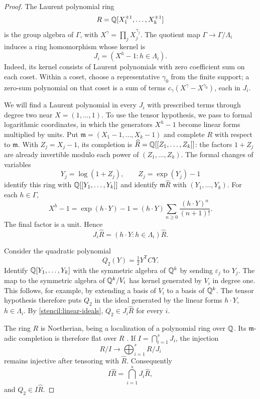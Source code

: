 \begin{proof}
The Laurent polynomial ring
\[
 R=\mathbb Q[X_1^{\pm1},\ldots,X_k^{\pm1}]
\]
is the group algebra of $\Gamma$, with $X^\gamma=\prod_jX_j^{\gamma_j}$.
The quotient map $\Gamma\to\Gamma/\Lambda_i$ induces a ring
homomorphism whose kernel is
\[
 J_i=(X^h-1:h\in\Lambda_i).
\]
Indeed, its kernel consists of Laurent polynomials with zero coefficient
sum on each coset. Within a coset, choose a representative $\gamma_0$
from the finite support; a zero-sum polynomial on that coset is a sum of
terms $c_\gamma(X^\gamma-X^{\gamma_0})$, each in $J_i$.

We will find a Laurent polynomial in every $J_i$ with prescribed
terms through degree two near $X=(1,\ldots,1)$.
To use the tensor hypothesis, we pass to formal logarithmic coordinates,
in which the generators $X^h-1$ become linear forms multiplied by units.
Put $\mathfrak m=(X_1-1,\ldots,X_k-1)$ and complete $R$ with respect
to $\mathfrak m$. With $Z_j=X_j-1$, its completion is
$\widehat R=\mathbb Q[[Z_1,\ldots,Z_k]]$: the factors $1+Z_j$ are already
invertible modulo each power of $(Z_1,\ldots,Z_k)$.
The formal changes of variables
\[
 Y_j=\log(1+Z_j),\qquad Z_j=\exp(Y_j)-1
\]
identify this ring with $\mathbb Q[[Y_1,\ldots,Y_k]]$ and identify
$\mathfrak m\widehat R$ with $(Y_1,\ldots,Y_k)$.
For each $h\in\Gamma$,
\[
 X^h-1=\exp(h\cdot Y)-1
       =(h\cdot Y)\sum_{n\geq0}\frac{(h\cdot Y)^n}{(n+1)!}.
\]
The final factor is a unit. Hence
\begin{equation}\label{stencil:linear-ideals}
 J_i\widehat R=(h\cdot Y:h\in\Lambda_i)\widehat R.
\end{equation}

Consider the quadratic polynomial
\[
 Q_2(Y)=\tfrac12Y^{\mathsf T}CY.
\]
Identify $\mathbb Q[Y_1,\ldots,Y_k]$ with the symmetric algebra of $\mathbb Q^k$
by sending $\varepsilon_j$ to $Y_j$. The map to the symmetric algebra
of $\mathbb Q^k/V_i$ has kernel generated by $V_i$ in degree one. This follows, for example,
by extending a basis of $V_i$ to a basis of $\mathbb Q^k$.
The tensor hypothesis therefore puts $Q_2$ in the ideal generated by
the linear forms $h\cdot Y$, $h\in\Lambda_i$. By
\eqref{stencil:linear-ideals}, $Q_2\in J_i\widehat R$ for every $i$.

The ring $R$ is Noetherian, being a localization of a polynomial ring
over $\mathbb Q$. Its $\mathfrak m$-adic completion is therefore flat over
$R$ \cite[Lemma~10.97.2, Tag~00MB]{stacks-completion}.
If $I=\bigcap_{i=1}^sJ_i$, the injection
\[
 R/I\longrightarrow\bigoplus_{i=1}^sR/J_i
\]
remains injective after tensoring with $\widehat R$. Consequently
\[
 I\widehat R=\bigcap_{i=1}^sJ_i\widehat R,
\]
and $Q_2\in I\widehat R$.


\end{proof}
